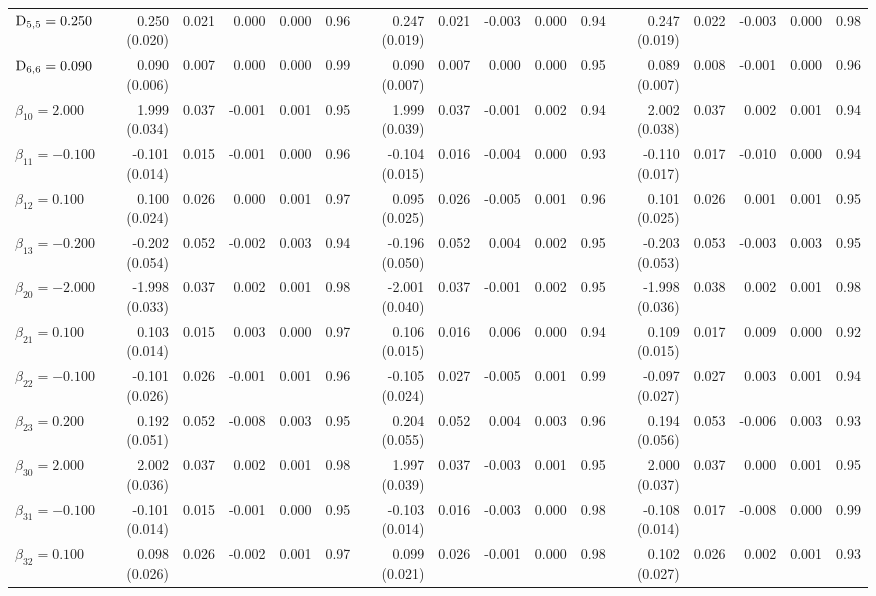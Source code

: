 \begin{landscape}
\begin{table}[ht]
\begin{tabular}{l|rrrrr:rrrrr:rrrrr}
  $\mathrm{D}_{5,5} = 0.250$ &  0.250 (0.020) & 0.021 &  0.000 & 0.000 & 0.96 &  0.247 (0.019) & 0.021 & -0.003 & 0.000 & 0.94 &  0.247 (0.019) & 0.022 & -0.003 & 0.000 & 0.98 \\ 
  $\mathrm{D}_{6,6} = 0.090$ &  0.090 (0.006) & 0.007 &  0.000 & 0.000 & 0.99 &  0.090 (0.007) & 0.007 &  0.000 & 0.000 & 0.95 &  0.089 (0.007) & 0.008 & -0.001 & 0.000 & 0.96 \\ 
  $\beta_{10} = 2.000$ &  1.999 (0.034) & 0.037 & -0.001 & 0.001 & 0.95 &  1.999 (0.039) & 0.037 & -0.001 & 0.002 & 0.94 &  2.002 (0.038) & 0.037 &  0.002 & 0.001 & 0.94 \\ 
  $\beta_{11} = -0.100$ & -0.101 (0.014) & 0.015 & -0.001 & 0.000 & 0.96 & -0.104 (0.015) & 0.016 & -0.004 & 0.000 & 0.93 & -0.110 (0.017) & 0.017 & -0.010 & 0.000 & 0.94 \\ 
  $\beta_{12} = 0.100$ &  0.100 (0.024) & 0.026 &  0.000 & 0.001 & 0.97 &  0.095 (0.025) & 0.026 & -0.005 & 0.001 & 0.96 &  0.101 (0.025) & 0.026 &  0.001 & 0.001 & 0.95 \\ 
  $\beta_{13} = -0.200$ & -0.202 (0.054) & 0.052 & -0.002 & 0.003 & 0.94 & -0.196 (0.050) & 0.052 &  0.004 & 0.002 & 0.95 & -0.203 (0.053) & 0.053 & -0.003 & 0.003 & 0.95 \\ 
  $\beta_{20} = -2.000$ & -1.998 (0.033) & 0.037 &  0.002 & 0.001 & 0.98 & -2.001 (0.040) & 0.037 & -0.001 & 0.002 & 0.95 & -1.998 (0.036) & 0.038 &  0.002 & 0.001 & 0.98 \\ 
  $\beta_{21} = 0.100$ &  0.103 (0.014) & 0.015 &  0.003 & 0.000 & 0.97 &  0.106 (0.015) & 0.016 &  0.006 & 0.000 & 0.94 &  0.109 (0.015) & 0.017 &  0.009 & 0.000 & 0.92 \\ 
  $\beta_{22} = -0.100$ & -0.101 (0.026) & 0.026 & -0.001 & 0.001 & 0.96 & -0.105 (0.024) & 0.027 & -0.005 & 0.001 & 0.99 & -0.097 (0.027) & 0.027 &  0.003 & 0.001 & 0.94 \\ 
  $\beta_{23} = 0.200$ &  0.192 (0.051) & 0.052 & -0.008 & 0.003 & 0.95 &  0.204 (0.055) & 0.052 &  0.004 & 0.003 & 0.96 &  0.194 (0.056) & 0.053 & -0.006 & 0.003 & 0.93 \\ 
  $\beta_{30} = 2.000$ &  2.002 (0.036) & 0.037 &  0.002 & 0.001 & 0.98 &  1.997 (0.039) & 0.037 & -0.003 & 0.001 & 0.95 &  2.000 (0.037) & 0.037 &  0.000 & 0.001 & 0.95 \\ 
  $\beta_{31} = -0.100$ & -0.101 (0.014) & 0.015 & -0.001 & 0.000 & 0.95 & -0.103 (0.014) & 0.016 & -0.003 & 0.000 & 0.98 & -0.108 (0.014) & 0.017 & -0.008 & 0.000 & 0.99 \\ 
  $\beta_{32} = 0.100$ &  0.098 (0.026) & 0.026 & -0.002 & 0.001 & 0.97 &  0.099 (0.021) & 0.026 & -0.001 & 0.000 & 0.98 &  0.102 (0.027) & 0.026 &  0.002 & 0.001 & 0.93 \\ 

\end{tabular}
\end{table}
\end{landscape}
